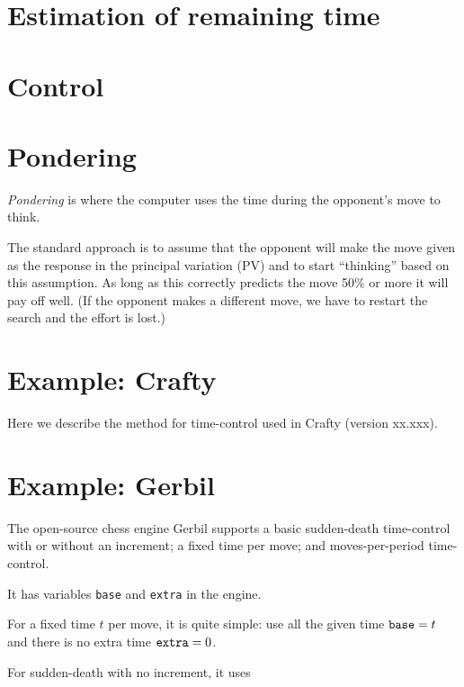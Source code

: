 \documentclass[10pt,dvipdfmx,letterpaper]{report}
\begin{document}
\section{Estimation of remaining time}
\section{Control}
\section{Pondering}
{\em Pondering} is where the computer uses the time during the opponent's move to
think.

The standard approach is to assume that the opponent will make the move given as the
response in the principal variation (PV) and to start ``thinking'' based on this assumption.
As long as this correctly predicts the move 50\% or more it will pay off well.  (If the
opponent makes a different move, we have to restart the search and the effort is lost.)

\section{Example: Crafty}

Here we describe the method for time-control used in Crafty (version xx.xxx).

\section{Example: Gerbil}

The open-source chess engine Gerbil supports a basic sudden-death time-control
with or without an increment; a fixed time per move;
and moves-per-period time-control.

It has variables \verb|base| and \verb|extra| in the engine.

For a fixed time $t$ per move, it is quite simple: use all the given
time $\verb|base|=t$ and there is no extra time $\verb|extra|=0$.

For sudden-death with no increment, it uses 
\end{document}
